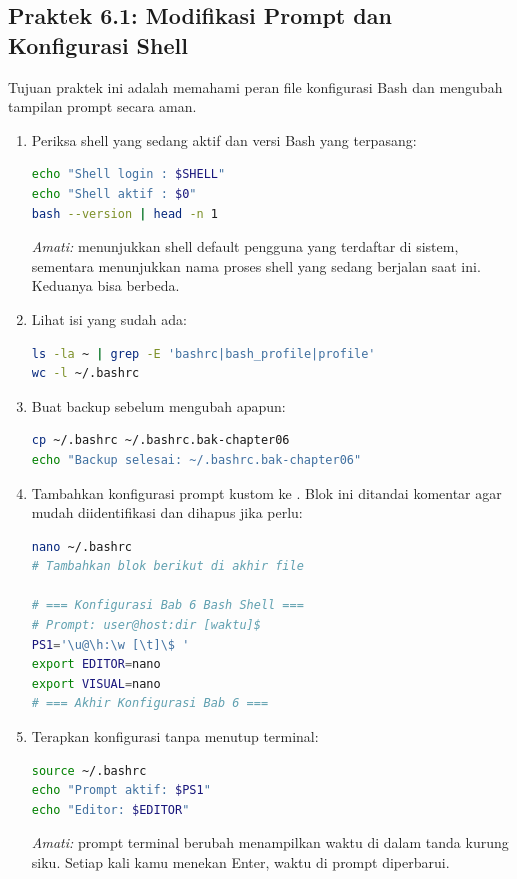 \subsection*{Praktek 6.1: Modifikasi Prompt dan Konfigurasi Shell}

Tujuan praktek ini adalah memahami peran file konfigurasi Bash dan
mengubah tampilan prompt secara aman.

\begin{enumerate}
    \item Periksa shell yang sedang aktif dan versi Bash yang terpasang:
\begin{lstlisting}[language=bash, caption={Memeriksa shell aktif}]
echo "Shell login : $SHELL"
echo "Shell aktif : $0"
bash --version | head -n 1
\end{lstlisting}
    \textit{Amati:}  menunjukkan shell default pengguna yang
    terdaftar di sistem, sementara  menunjukkan nama proses shell
    yang sedang berjalan saat ini. Keduanya bisa berbeda.

    \item Lihat isi  yang sudah ada:
\begin{lstlisting}[language=bash, caption={Melihat konfigurasi .bashrc saat ini}]
ls -la ~ | grep -E 'bashrc|bash_profile|profile'
wc -l ~/.bashrc
\end{lstlisting}

    \item Buat backup  sebelum mengubah apapun:
\begin{lstlisting}[language=bash, caption={Membuat backup .bashrc}]
cp ~/.bashrc ~/.bashrc.bak-chapter06
echo "Backup selesai: ~/.bashrc.bak-chapter06"
\end{lstlisting}

    \item Tambahkan konfigurasi prompt kustom ke . Blok ini
          ditandai komentar agar mudah diidentifikasi dan dihapus jika perlu:
\begin{lstlisting}[language=bash, caption={Menambahkan konfigurasi prompt ke .bashrc}]
nano ~/.bashrc
# Tambahkan blok berikut di akhir file

# === Konfigurasi Bab 6 Bash Shell ===
# Prompt: user@host:dir [waktu]$
PS1='\u@\h:\w [\t]\$ '
export EDITOR=nano
export VISUAL=nano
# === Akhir Konfigurasi Bab 6 ===

\end{lstlisting}

    \item Terapkan konfigurasi tanpa menutup terminal:
\begin{lstlisting}[language=bash, caption={Memuat ulang konfigurasi Bash}]
source ~/.bashrc
echo "Prompt aktif: $PS1"
echo "Editor: $EDITOR"
\end{lstlisting}
    \textit{Amati:} prompt terminal berubah menampilkan waktu di dalam
    tanda kurung siku. Setiap kali kamu menekan Enter, waktu di prompt
    diperbarui.


\end{enumerate}
